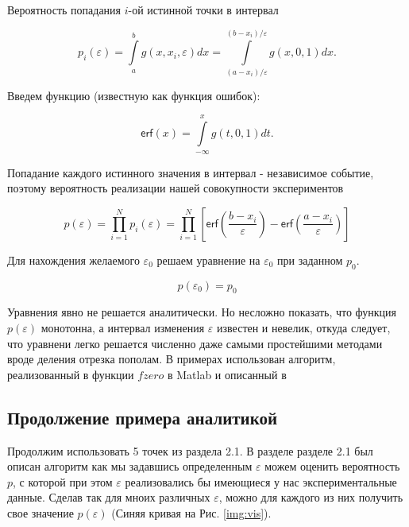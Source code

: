 \documentclass[a4paper,12pt]{article} %
\begin{document}
Вероятность попадания $i$-ой истинной точки в интервал

\begin{equation}
p_i(\varepsilon) = \int\limits_a^b g \left(x, x_i, \varepsilon \right) dx = \int\limits_{(a-x_i)/\varepsilon}^{(b-x_i)/\varepsilon} g(x, 0, 1) dx.
\end{equation}

Введем функцию (известную как функция ошибок):

\begin{equation}
\textsf{erf}(x) = \int\limits_{- \infty}^x g(t, 0, 1) dt.
\end{equation}

Попадание каждого истинного значения в интервал - независимое событие, поэтому вероятность реализации нашей совокупности экспериментов

\begin{equation}
p(\varepsilon) = \prod_{i = 1}^N p_i(\varepsilon) = \prod_{i = 1}^N \left[ \textsf{erf} \left( \dfrac{b - x_i}{\varepsilon} \right) - \textsf{erf} \left( \dfrac{a - x_i}{\varepsilon} \right) \right]
\end{equation}

Для нахождения желаемого $\varepsilon_0$ решаем уравнение на $\varepsilon_0$ при заданном $p_0$.

\begin{equation}
p(\varepsilon_0) = p_0
\end{equation}

Уравнения явно не решается аналитически. Но несложно показать, что функция $p(\varepsilon)$ монотонна, а интервал изменения $\varepsilon$ известен и невелик, откуда следует, что уравнени легко решается численно даже самыми простейшими методами вроде деления отрезка пополам. В примерах использован алгоритм, реализованный в функции $fzero$ в Matlab и описанный в \cite{grund1979forsythe}

\newpage

\subsection{Продолжение примера аналитикой}

Продолжим использовать 5 точек из раздела 2.1. В разделе разделе 2.1 был описан алгоритм как мы задавшись определенным $\varepsilon$ можем оценить вероятность $p$, с которой при этом $\varepsilon$ реализовались бы имеющиеся у нас экспериментальные данные. Сделав так для мноих различных $\varepsilon$, можно для каждого из них получить свое значение $p(\varepsilon)$ (Синяя кривая на Рис. \ref{img:vis}).
\end{document}
